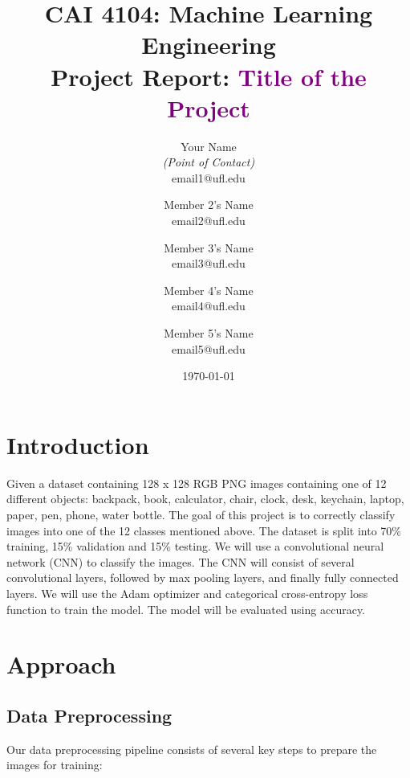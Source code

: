\documentclass[10pt]{article}
\title{CAI 4104: Machine Learning Engineering\\
	\large Project Report:  {\textcolor{purple}{Title of the Project}}} %
\author{
        Your Name \\{\em (Point of Contact)} \\
        email1@ufl.edu\\
        \and
        Member 2's Name \\
        email2@ufl.edu\\
        \and
        Member 3's Name \\
        email3@ufl.edu\\
        \and
        Member 4's Name \\
        email4@ufl.edu\\
        \and
        Member 5's Name \\
        email5@ufl.edu\\
}
\date{\today}
\begin{document}

\maketitle






\section{Introduction}

Given a dataset containing 128 x 128 RGB PNG images containing one of 12 different objects: backpack, book, calculator, chair, clock, desk, keychain, laptop, paper, pen, phone, water bottle. The
goal of this project is to correctly classify images into one of the 12 classes mentioned above. The dataset is split into 70\% training, 15\% validation and 15\% testing. We will use a 
convolutional neural network (CNN) to classify the images. The CNN will consist of several convolutional layers, followed by max pooling layers, and finally fully connected layers. 
We will use the Adam optimizer and categorical cross-entropy loss function to train the model. The model will be evaluated using accuracy.



\section{Approach}

\subsection{Data Preprocessing}

Our data preprocessing pipeline consists of several key steps to prepare the images for training:
\end{document}
